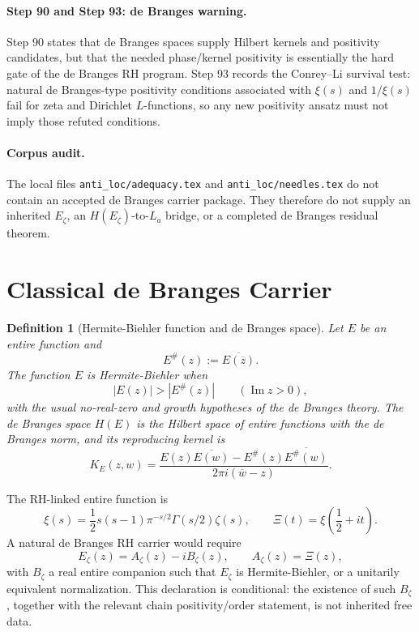 \documentclass[11pt]{article}
\newtheorem{definition}{Definition}
\begin{document}
\paragraph{Step 90 and Step 93: de Branges warning.}
Step 90 states that de Branges spaces supply Hilbert kernels and positivity
candidates, but that the needed phase/kernel positivity is essentially the
hard gate of the de Branges RH program.  Step 93 records the Conrey--Li
survival test: natural de Branges-type positivity conditions associated with
\(\xi(s)\) and \(1/\xi(s)\) fail for zeta and Dirichlet \(L\)-functions, so
any new positivity ansatz must not imply those refuted conditions.

\paragraph{Corpus audit.}
The local files \texttt{anti\_loc/adequacy.tex} and
\texttt{anti\_loc/needles.tex} do not contain an accepted de Branges carrier
package.  They therefore do not supply an inherited \(E_\zeta\), an
\(H(E_\zeta)\)-to-\(L_a\) bridge, or a completed de Branges residual theorem.

\section*{Classical de Branges Carrier}

\begin{definition}[Hermite-Biehler function and de Branges space]
Let \(E\) be an entire function and
\[
E^\#(z):=\overline{E(\overline z)}.
\]
The function \(E\) is Hermite-Biehler when
\[
|E(z)|>|E^\#(z)| \qquad (\operatorname{Im}z>0),
\]
with the usual no-real-zero and growth hypotheses of the de Branges theory.
The de Branges space \(H(E)\) is the Hilbert space of entire functions with
the de Branges norm, and its reproducing kernel is
\[
K_E(z,w)=
\frac{
E(z)\overline{E(w)}-E^\#(z)\overline{E^\#(w)}
}{
2\pi i(\overline w-z)
}.
\]
\end{definition}

The RH-linked entire function is
\[
\xi(s)=\frac12s(s-1)\pi^{-s/2}\Gamma(s/2)\zeta(s),
\qquad
\Xi(t)=\xi\!\left(\frac12+it\right).
\]
A natural de Branges RH carrier would require
\[
E_\zeta(z)=A_\zeta(z)-iB_\zeta(z),\qquad A_\zeta(z)=\Xi(z),
\]
with \(B_\zeta\) a real entire companion such that \(E_\zeta\) is
Hermite-Biehler, or a unitarily equivalent normalization.  This declaration is
conditional: the existence of such \(B_\zeta\), together with the relevant
chain positivity/order statement, is not inherited free data.
\end{document}
